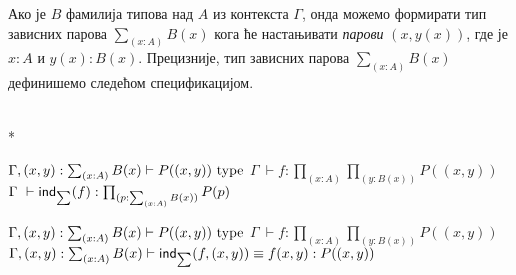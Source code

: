 \documentclass[12pt,oneside]{memoir}
\begin{document}
Ако је $B$ фамилија типова над $A$ из контекста $\Gamma$, онда можемо формирати тип зависних парова $\sum_{(x : A)} B(x)$ кога ће настањивати \emph{парови} $(x, y(x))$, где је $x : A$ и $y(x) : B (x)$. Прецизније, тип зависних парова $\sum_{(x : A)} B(x)$ дефинишемо следећом спецификацијом.
\begin{samepage}
    \begin{center}
        \begin{minipage}{.40\textwidth}
            \begin{prooftree}
            \end{prooftree}
        \end{minipage}
        \begin{minipage}{.45\textwidth}
            \begin{prooftree}
            \end{prooftree}
        \end{minipage}
        \\*
        \bigskip%
        \begin{minipage}{\textwidth}
            \begin{prooftree}
                \def\fCenter{\Gamma}
                \Axiom$\fCenter, (x, y) : \sum_{(x : A)} B(x) \vdash P((x, y))~\type$
                \noLine%
                \UnaryInf$\fCenter\ \vdash f : \prod_{(x : A)} \prod_{(y : B(x))} P((x, y))$
                \UnaryInf$\fCenter\ \vdash \ind{\sum} (f) : \prod_{(p : \sum_{(x:A)} B(x))} P(p)$
            \end{prooftree}
        \end{minipage}
    \end{center}
\end{samepage}
\newpage%
\begin{samepage}
    \begin{center}
       \begin{minipage}{\textwidth}
            \begin{prooftree}
                \def\fCenter{\Gamma}
                \Axiom$\fCenter, (x, y) : \sum_{(x : A)} B(x) \vdash P((x, y))~\type$
                \noLine%
                \UnaryInf$\fCenter\ \vdash f : \prod_{(x : A)} \prod_{(y : B(x))} P((x, y))$
                \UnaryInf$\fCenter, (x, y) : \sum_{(x : A)} B(x) \vdash \ind{\sum} (f, (x, y)) \equiv f(x, y) : P((x, y))$
            \end{prooftree}
        \end{minipage}
    \end{center}
\end{samepage}
\end{document}
